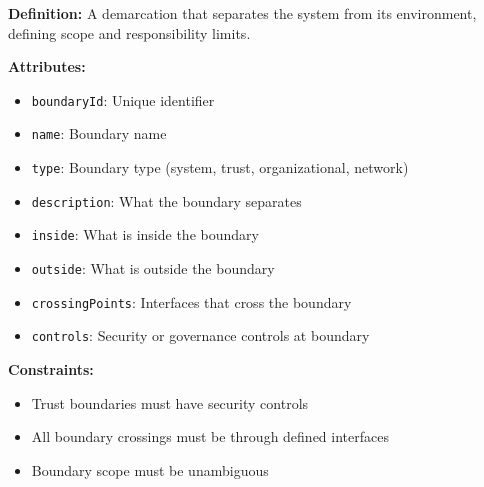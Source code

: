 \documentclass[11pt,letterpaper]{article}
\begin{document}
\begin{definitionbox}
\textbf{Definition:} A demarcation that separates the system from its environment, defining scope and responsibility limits.

\textbf{Attributes:}
\begin{itemize}[nosep]
    \item \texttt{boundaryId}: Unique identifier
    \item \texttt{name}: Boundary name
    \item \texttt{type}: Boundary type (system, trust, organizational, network)
    \item \texttt{description}: What the boundary separates
    \item \texttt{inside}: What is inside the boundary
    \item \texttt{outside}: What is outside the boundary
    \item \texttt{crossingPoints}: Interfaces that cross the boundary
    \item \texttt{controls}: Security or governance controls at boundary
\end{itemize}

\textbf{Constraints:}
\begin{itemize}[nosep]
    \item Trust boundaries must have security controls
    \item All boundary crossings must be through defined interfaces
    \item Boundary scope must be unambiguous
\end{itemize}
\end{definitionbox}
\end{document}
